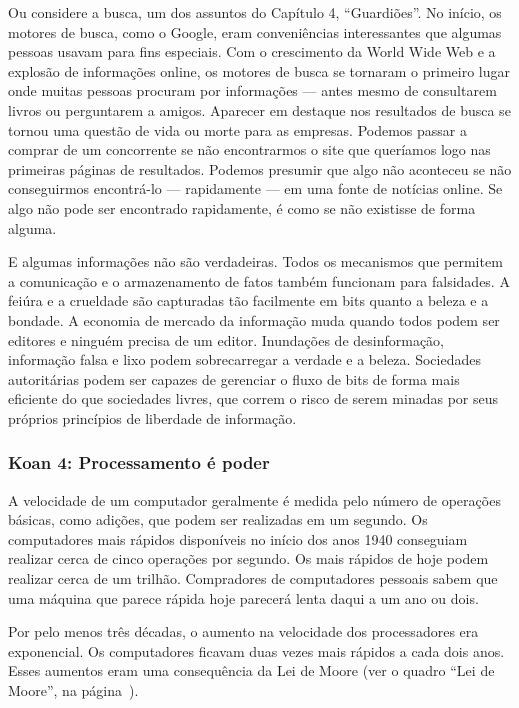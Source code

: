 Ou considere a busca, um dos assuntos do Capítulo 4, ``Guardiões''. No início,
os motores de busca, como o Google, eram conveniências interessantes que algumas
pessoas usavam para fins especiais. Com o crescimento da World Wide Web e a 
explosão de informações online, os motores de busca se tornaram o primeiro lugar 
onde muitas pessoas procuram por informações --- antes mesmo de consultarem
livros ou perguntarem a amigos. Aparecer em destaque nos resultados de busca se
tornou uma questão de vida ou morte para as empresas. Podemos passar a comprar 
de um concorrente se não encontrarmos o site que queríamos logo nas primeiras 
páginas de resultados. Podemos presumir que algo não aconteceu se não 
conseguirmos encontrá-lo --- rapidamente --- em uma fonte de notícias online.
Se algo não pode ser encontrado rapidamente, é como se não existisse de forma
alguma.

E algumas informações não são verdadeiras. Todos os mecanismos que permitem a
comunicação e o armazenamento de fatos também funcionam para falsidades. A 
feiúra e a crueldade são capturadas tão facilmente em bits quanto a beleza e a 
bondade. A economia de mercado da informação muda quando todos podem ser 
editores e ninguém precisa de um editor. Inundações de desinformação, informação 
falsa e lixo podem sobrecarregar a verdade e a beleza. Sociedades autoritárias 
podem ser capazes de gerenciar o fluxo de bits de forma mais eficiente do que 
sociedades livres, que correm o risco de serem minadas por seus próprios 
princípios de liberdade de informação.


\subsubsection*{Koan 4: Processamento é poder}
\label{cap1:exp-dig-koans:4}
A velocidade de um computador geralmente é medida pelo número de operações 
básicas, como adições, que podem ser realizadas em um segundo. Os computadores 
mais rápidos disponíveis no início dos anos 1940 conseguiam realizar cerca de 
cinco operações por segundo. Os mais rápidos de hoje podem realizar cerca de um 
trilhão. Compradores de computadores pessoais sabem que uma máquina que parece 
rápida hoje parecerá lenta daqui a um ano ou dois.

Por pelo menos três décadas, o aumento na velocidade dos processadores era 
exponencial. Os computadores ficavam duas vezes mais rápidos a cada dois anos. 
Esses aumentos eram uma consequência da Lei de Moore (ver o quadro ``Lei de
Moore'', na página~\pageref{qd:moore}).

